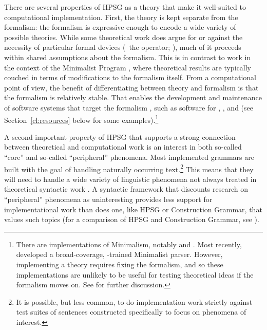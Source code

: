 \documentclass[output=paper,biblatex,babelshorthands,newtxmath,draftmode,colorlinks,citecolor=brown]{langscibook}
\begin{document}
There are several properties of HPSG as a theory that make it well-suited to computational implementation.
First, the theory is kept separate from the formalism:
the formalism is expressive enough to encode a wide variety of possible theories.
While some theoretical work does argue for or against the necessity of particular formal devices
(\eg\ the  operator; \citealt{Reape94a}),
much of it proceeds within shared assumptions about the formalism.
This is in contrast to work in the context of the Minimalist Program \citep{Chomsky95a-u},
where theoretical results are typically couched in terms of modifications to the formalism itself.
From a computational point of view, the benefit of differentiating between theory and formalism
is that the formalism is relatively stable.
That enables the development and maintenance of software systems that target the formalism \citep{boguraev1988software},
such as software for , , and 
(see Section~\ref{cl:resources} below for some examples).\footnote{%
	There are implementations of Minimalism, notably \citet{Stabler97a-u} and \citet{Herring:16}.
	Most recently, \citet{Torr2019a-u} developed a broad-coverage, -trained Minimalist parser.
	However, implementing a theory requires fixing the formalism,
	and so these implementations are unlikely to be useful for testing theoretical ideas
	if the formalism moves on.
	See  for further discussion.
}

A second important property of HPSG that supports a strong connection between theoretical and
computational work is an interest in both so-called ``core'' and so-called ``peripheral'' phenomena. Most implemented grammars are built with the goal of handling naturally occurring text.\footnote{It is possible, but less common, to do implementation work strictly against test suites of sentences constructed specifically to focus on phenomena of interest.} This means that they will need to handle a wide variety of linguistic phenomena not always treated in theoretical syntactic work \citep{Baldwin-et-al-05}. A syntactic framework that discounts research on ``peripheral'' phenomena as uninteresting provides less support for implementational work than does one, like HPSG or Construction Grammar\indexcxg, that values such topics (for a comparison of HPSG and Construction Grammar, see ).
\end{document}
